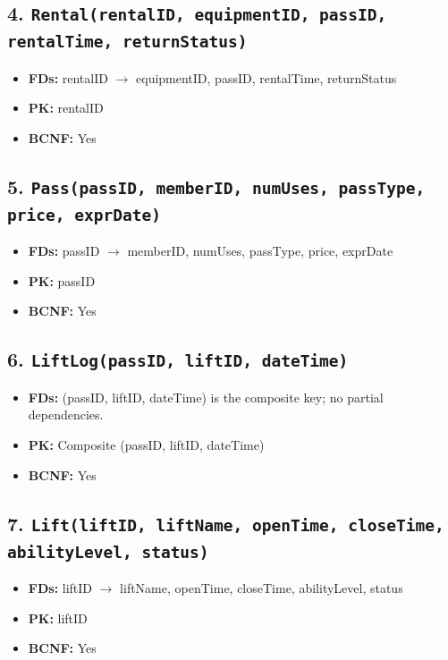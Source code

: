 \documentclass[11pt]{scrartcl}
\begin{document}
\subsection*{4. \texttt{Rental(rentalID, equipmentID, passID, rentalTime, returnStatus)}}
\begin{itemize}
  \item \textbf{FDs:} rentalID $\rightarrow$ equipmentID, passID, rentalTime, returnStatus
  \item \textbf{PK:} rentalID
  \item \textbf{BCNF:} Yes 
\end{itemize}

\subsection*{5. \texttt{Pass(passID, memberID, numUses, passType, price, exprDate)}}
\begin{itemize}
  \item \textbf{FDs:} passID $\rightarrow$ memberID, numUses, passType, price, exprDate
  \item \textbf{PK:} passID
  \item \textbf{BCNF:} Yes
\end{itemize}

\subsection*{6. \texttt{LiftLog(passID, liftID, dateTime)}}
\begin{itemize}
  \item \textbf{FDs:} (passID, liftID, dateTime) is the composite key; no partial dependencies.
  \item \textbf{PK:} Composite (passID, liftID, dateTime)
  \item \textbf{BCNF:} Yes
\end{itemize}

\subsection*{7. \texttt{Lift(liftID, liftName, openTime, closeTime, abilityLevel, status)}}
\begin{itemize}
  \item \textbf{FDs:} liftID $\rightarrow$ liftName, openTime, closeTime, abilityLevel, status
  \item \textbf{PK:} liftID
  \item \textbf{BCNF:} Yes
\end{itemize}
\end{document}
